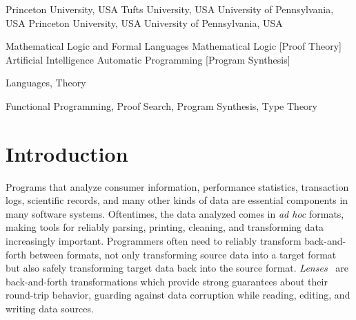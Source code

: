 \documentclass[acmsmall]{acmart}
\begin{document}
\ifanon
\maketitle
\else
{}
           {Princeton University, USA}
           {}
           {Tufts University, USA}
           {}
           {University of Pennsylvania, USA}
           {}
           {Princeton University, USA}
           {}
           {University of Pennsylvania, USA}
           {}
\maketitle
\fi

\ifanon\else
{}
{Mathematical Logic and Formal Languages}
{Mathematical Logic}
[Proof Theory]
{Artificial Intelligence}
{Automatic Pro\-gramming}
[Program Synthesis]

\terms Languages, Theory

\keywords Functional Programming, Proof Search, Program Synthesis, Type Theory
\fi

\section{Introduction}

Programs that analyze consumer information, performance statistics, transaction
logs, scientific records, and many other kinds of data are essential components
in many software systems.
Oftentimes, the data analyzed comes in \emph{ad hoc} formats, making
tools for reliably parsing, printing, cleaning, and transforming data
increasingly important.
Programmers often need to reliably transform back-and-forth between
formats, not only transforming source data into a target
format but also safely transforming target data back into the source format.
\emph{Lenses}~\cite{Focal2005-long} are back-and-forth
transformations which provide strong guarantees about their round-trip behavior,
guarding against data corruption
while reading, editing, and writing data sources.  
\end{document}
